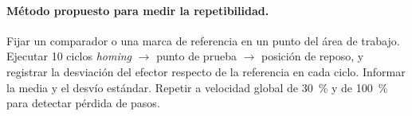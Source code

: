\paragraph{Método propuesto para medir la repetibilidad.}
 Fijar un comparador o una marca de referencia en un punto del área
de trabajo. Ejecutar 10 ciclos \emph{homing} $\rightarrow$ punto de prueba $\rightarrow$
posición de reposo, y registrar la desviación del efector respecto de la referencia en cada
ciclo. Informar la media y el desvío estándar. Repetir a velocidad global de 30~\% y de
100~\% para detectar pérdida de pasos.

